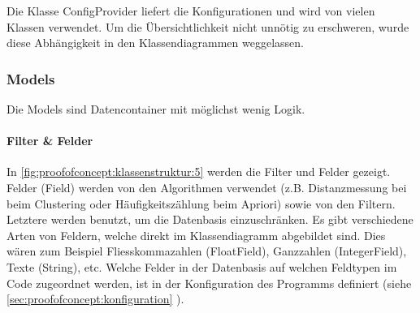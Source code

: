 Die Klasse ConfigProvider liefert die Konfigurationen und wird von vielen Klassen verwendet. Um die Übersichtlichkeit nicht unnötig zu erschweren, wurde diese Abhängigkeit in den Klassendiagrammen weggelassen. 

\subsubsection{Models}
\label{sec:proofofconcept:klassenstruktur:models}
Die Models sind Datencontainer mit möglichst wenig Logik. 

\paragraph{Filter \& Felder} In \cref{fig:proofofconcept:klassenstruktur:5} werden die Filter und Felder gezeigt. Felder (Field) werden von den Algorithmen verwendet (z.B. Distanzmessung bei beim Clustering oder Häufigkeitszählung beim Apriori) sowie von den Filtern. Letztere werden benutzt, um die Datenbasis einzuschränken. Es gibt verschiedene Arten von Feldern, welche direkt im Klassendiagramm abgebildet sind. Dies wären zum Beispiel Fliesskommazahlen (FloatField), Ganzzahlen (IntegerField), Texte (String), etc. Welche Felder in der Datenbasis auf welchen Feldtypen im Code zugeordnet werden, ist in der Konfiguration des Programms definiert (siehe \cref{sec:proofofconcept:konfiguration} ).

